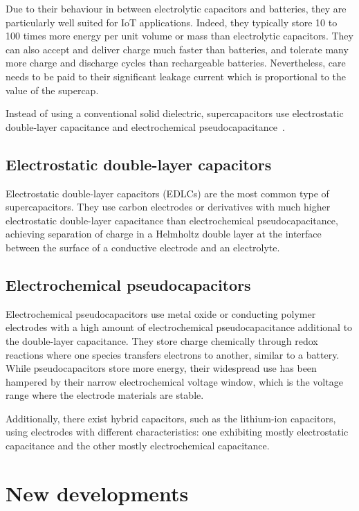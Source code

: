 \documentclass{EPL-master-thesis-covers-EN}
\begin{document}
Due to their behaviour in between electrolytic capacitors and batteries, they are particularly well suited for IoT applications. Indeed, they typically store 10 to 100 times more energy per unit volume or mass than electrolytic capacitors. They can also accept and deliver charge much faster than batteries, and tolerate many more charge and discharge cycles than rechargeable batteries. Nevertheless, care needs to be paid to their significant leakage current which is proportional to the value of the supercap.

Instead of using a conventional solid dielectric, supercapacitors use electrostatic double-layer capacitance and electrochemical pseudocapacitance~\cite{2019JPS...414..420B}.

\subsection*{Electrostatic double-layer capacitors}

Electrostatic double-layer capacitors (EDLCs) are the most common type of supercapacitors. They use carbon electrodes or derivatives with much higher electrostatic double-layer capacitance than electrochemical pseudocapacitance, achieving separation of charge in a Helmholtz double layer at the interface between the surface of a conductive electrode and an electrolyte.

\subsection*{Electrochemical pseudocapacitors}

Electrochemical pseudocapacitors use metal oxide or conducting polymer electrodes with a high amount of electrochemical pseudocapacitance additional to the double-layer capacitance. They store charge chemically through redox reactions where one species transfers electrons to another, similar to a battery. While pseudocapacitors store more energy, their widespread use has been hampered by their narrow electrochemical voltage window, which is the voltage range where the electrode materials are stable.

Additionally, there exist hybrid capacitors, such as the lithium-ion capacitors, using electrodes with different characteristics: one exhibiting mostly electrostatic capacitance and the other mostly electrochemical capacitance.

\section{New developments}
\end{document}
